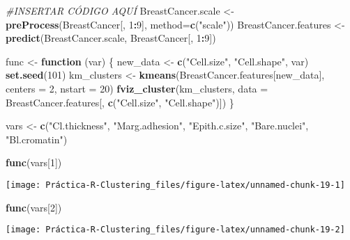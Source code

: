 \documentclass[
]{article}
\newenvironment{Shaded}{\begin{snugshade}}{\end{snugshade}}
\newcommand{\CommentTok}[1]{\textcolor[rgb]{0.56,0.35,0.01}{\textit{#1}}}
\newcommand{\ControlFlowTok}[1]{\textcolor[rgb]{0.13,0.29,0.53}{\textbf{#1}}}
\newcommand{\DataTypeTok}[1]{\textcolor[rgb]{0.13,0.29,0.53}{#1}}
\newcommand{\DecValTok}[1]{\textcolor[rgb]{0.00,0.00,0.81}{#1}}
\newcommand{\KeywordTok}[1]{\textcolor[rgb]{0.13,0.29,0.53}{\textbf{#1}}}
\newcommand{\NormalTok}[1]{#1}
\newcommand{\OperatorTok}[1]{\textcolor[rgb]{0.81,0.36,0.00}{\textbf{#1}}}
\newcommand{\StringTok}[1]{\textcolor[rgb]{0.31,0.60,0.02}{#1}}
\begin{document}
\begin{Shaded}
\begin{Highlighting}[]
\CommentTok{#INSERTAR CÓDIGO AQUÍ}
\NormalTok{BreastCancer.scale <-}\StringTok{ }\KeywordTok{preProcess}\NormalTok{(BreastCancer[, }\DecValTok{1}\OperatorTok{:}\DecValTok{9}\NormalTok{], }\DataTypeTok{method=}\KeywordTok{c}\NormalTok{(}\StringTok{"scale"}\NormalTok{))}
\NormalTok{BreastCancer.features <-}\StringTok{ }\KeywordTok{predict}\NormalTok{(BreastCancer.scale, BreastCancer[, }\DecValTok{1}\OperatorTok{:}\DecValTok{9}\NormalTok{])}

\NormalTok{func <-}\StringTok{ }\ControlFlowTok{function}\NormalTok{ (var) \{ }
\NormalTok{  new_data <-}\StringTok{ }\KeywordTok{c}\NormalTok{(}\StringTok{"Cell.size"}\NormalTok{, }\StringTok{"Cell.shape"}\NormalTok{, var)}
  \KeywordTok{set.seed}\NormalTok{(}\DecValTok{101}\NormalTok{)}
\NormalTok{  km_clusters <-}\StringTok{ }\KeywordTok{kmeans}\NormalTok{(BreastCancer.features[new_data], }\DataTypeTok{centers =} \DecValTok{2}\NormalTok{, }\DataTypeTok{nstart =} \DecValTok{20}\NormalTok{)}
  \KeywordTok{fviz_cluster}\NormalTok{(km_clusters, }\DataTypeTok{data =}\NormalTok{ BreastCancer.features[, }\KeywordTok{c}\NormalTok{(}\StringTok{"Cell.size"}\NormalTok{, }\StringTok{"Cell.shape"}\NormalTok{)])}
\NormalTok{\}}

\NormalTok{vars <-}\StringTok{ }\KeywordTok{c}\NormalTok{(}\StringTok{"Cl.thickness"}\NormalTok{, }\StringTok{"Marg.adhesion"}\NormalTok{, }\StringTok{"Epith.c.size"}\NormalTok{, }\StringTok{"Bare.nuclei"}\NormalTok{, }\StringTok{"Bl.cromatin"}\NormalTok{)}

\KeywordTok{func}\NormalTok{(vars[}\DecValTok{1}\NormalTok{])}
\end{Highlighting}
\end{Shaded}

\begin{center}\texttt{[image: Práctica-R-Clustering\_files/figure-latex/unnamed-chunk-19-1]} \end{center}

\begin{Shaded}
\begin{Highlighting}[]
\KeywordTok{func}\NormalTok{(vars[}\DecValTok{2}\NormalTok{])}
\end{Highlighting}
\end{Shaded}

\begin{center}\texttt{[image: Práctica-R-Clustering\_files/figure-latex/unnamed-chunk-19-2]} \end{center}
\end{document}
